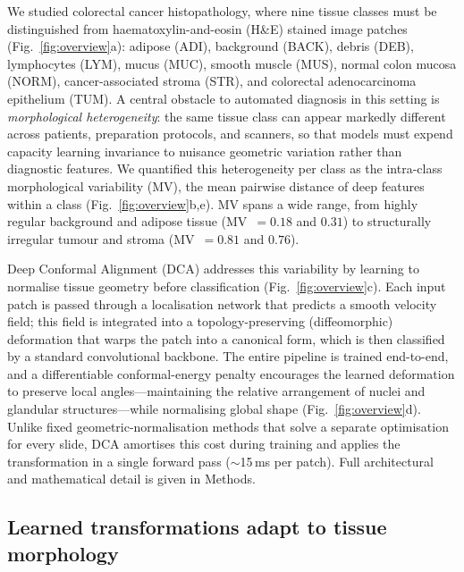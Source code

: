 \documentclass[pdflatex,sn-nature]{sn-jnl}%
\theoremstyle{thmstyleone}%
\theoremstyle{thmstyletwo}%
\theoremstyle{thmstylethree}%
\begin{document}
We studied colorectal cancer histopathology, where nine tissue classes must be
distinguished from haematoxylin-and-eosin (H\&E) stained image patches
(Fig.~\ref{fig:overview}a): adipose (ADI), background (BACK), debris (DEB),
lymphocytes (LYM), mucus (MUC), smooth muscle (MUS), normal colon mucosa
(NORM), cancer-associated stroma (STR), and colorectal adenocarcinoma
epithelium (TUM). A central obstacle to automated diagnosis in this setting is
\textit{morphological heterogeneity}: the same tissue class can appear markedly
different across patients, preparation protocols, and scanners, so that models
must expend capacity learning invariance to nuisance geometric variation rather
than diagnostic features. We quantified this heterogeneity per class as the
intra-class morphological variability (MV), the mean pairwise distance of
deep features within a class (Fig.~\ref{fig:overview}b,e). MV spans a wide range,
from highly regular background and adipose tissue (MV~$=0.18$ and $0.31$) to
structurally irregular tumour and stroma (MV~$=0.81$ and $0.76$).

Deep Conformal Alignment (DCA) addresses this variability by learning to
normalise tissue geometry before classification (Fig.~\ref{fig:overview}c).
Each input patch is passed through a localisation network that predicts a
smooth velocity field; this field is integrated into a topology-preserving
(diffeomorphic) deformation that warps the patch into a canonical form, which is
then classified by a standard convolutional backbone. The entire pipeline is
trained end-to-end, and a differentiable conformal-energy penalty encourages the
learned deformation to preserve local angles---maintaining the relative
arrangement of nuclei and glandular structures---while normalising global shape
(Fig.~\ref{fig:overview}d). Unlike fixed geometric-normalisation methods that
solve a separate optimisation for every slide, DCA amortises this cost during
training and applies the transformation in a single forward pass
($\sim$15\,ms per patch). Full architectural and mathematical detail is given in
Methods.


\subsection{Learned transformations adapt to tissue morphology}
\end{document}
